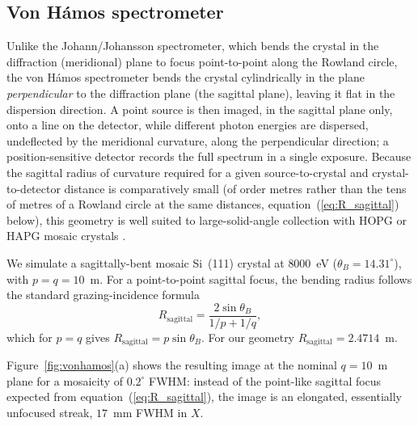 \documentclass{iucr}
\begin{document}
\subsection{Von H\'amos spectrometer}
\label{sec:VonHamos}

Unlike the Johann/Johansson spectrometer, which bends the crystal in the
diffraction (meridional) plane to focus point-to-point along the Rowland circle,
the von H\'amos spectrometer \cite{Szlachetko2012, Zastrau2012, Zastrau2013,
Sokoltsova2022} bends the crystal cylindrically in the plane
\emph{perpendicular} to the diffraction plane (the sagittal plane), leaving it
flat in the dispersion direction. A point source is then imaged, in the sagittal
plane only, onto a line on the detector, while different photon energies are
dispersed, undeflected by the meridional curvature, along the perpendicular
direction; a position-sensitive detector records the full spectrum in a single
exposure. Because the sagittal radius of curvature required for a given
source-to-crystal and crystal-to-detector distance is comparatively small (of
order metres rather than the tens of metres of a Rowland circle at the same
distances, equation~(\ref{eq:R_sagittal}) below), this geometry is well suited
to large-solid-angle collection with HOPG or HAPG mosaic crystals
\cite{Zastrau2012, Zastrau2013, Sokoltsova2022, Szlachetko2012}.

We simulate a sagittally-bent mosaic Si~(111) crystal at $8000$~eV
($\theta_B = 14.31^\circ$), with $p=q=10$~m. For a point-to-point sagittal focus,
the bending radius follows the standard grazing-incidence formula
\begin{equation}
R_\mathrm{sagittal} = \frac{2 \sin\theta_B}{1/p + 1/q} ,
\label{eq:R_sagittal}
\end{equation}
which for $p=q$ gives $R_\mathrm{sagittal} = p \sin\theta_B$. For our geometry
$R_\mathrm{sagittal} = 2.4714$~m.

Figure~\ref{fig:vonhamos}(a) shows the resulting image at the nominal $q=10$~m
plane for a mosaicity of $0.2^\circ$ FWHM: instead of the point-like sagittal
focus expected from equation~(\ref{eq:R_sagittal}), the image is an elongated,
essentially unfocused streak, $17$~mm FWHM in $X$.
\end{document}
